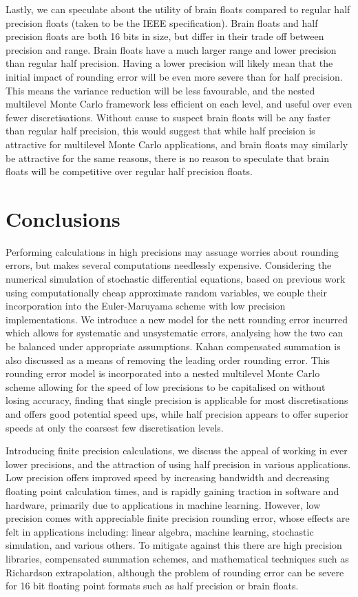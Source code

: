 \documentclass[manuscript,review]{acmart}
\begin{document}
Lastly, we can speculate about the utility of brain floats compared to regular half precision floats (taken to be the IEEE specification). Brain floats and half precision floats are both 16 bits in size, but differ in their trade off between precision and range. Brain floats have a much larger range and lower precision than regular half precision. Having a lower precision will likely mean that the initial impact of rounding error will be even more severe than for half precision. This means the variance reduction will be less favourable, and the nested multilevel Monte Carlo framework less efficient on each level, and useful over even fewer discretisations. Without cause to suspect brain floats will be any faster than regular half precision, this would suggest that while half precision is attractive for multilevel Monte Carlo applications, and brain floats may similarly be attractive for the same reasons, there is no reason to speculate that brain floats will be competitive over regular half precision floats. 

\section{Conclusions}
\label{sec:conclusions}

Performing calculations in high precisions may assuage worries about rounding errors, but makes several computations needlessly expensive. Considering the numerical simulation of stochastic differential equations, based on previous work using computationally cheap approximate random variables, we couple their incorporation into the Euler-Maruyama scheme with low precision implementations. We introduce a new model for the nett rounding error incurred which allows for systematic and unsystematic errors, analysing how the two can be balanced under appropriate assumptions. Kahan compensated summation is also discussed as a means of removing the leading order rounding error. This rounding error model is incorporated into a nested multilevel Monte Carlo scheme allowing for the speed of low precisions to be capitalised on without losing accuracy, finding that single precision is applicable for most discretisations and offers good potential speed ups, while half precision appears to offer superior speeds at only the coarsest few discretisation levels. 

Introducing finite precision calculations, we discuss the appeal of working in ever lower precisions, and the attraction of using half precision in various applications. Low precision offers improved speed by increasing bandwidth and decreasing floating point calculation times, and is rapidly gaining traction in software and hardware, primarily due to applications in machine learning. However, low precision comes with appreciable finite precision rounding error, whose effects are felt in applications including: linear algebra, machine learning, stochastic simulation, and various others. To mitigate against this there are high precision libraries, compensated summation schemes, and mathematical techniques such as Richardson extrapolation, although the problem of rounding error can be severe for 16 bit floating point formats such as half precision or brain floats.
\end{document}
